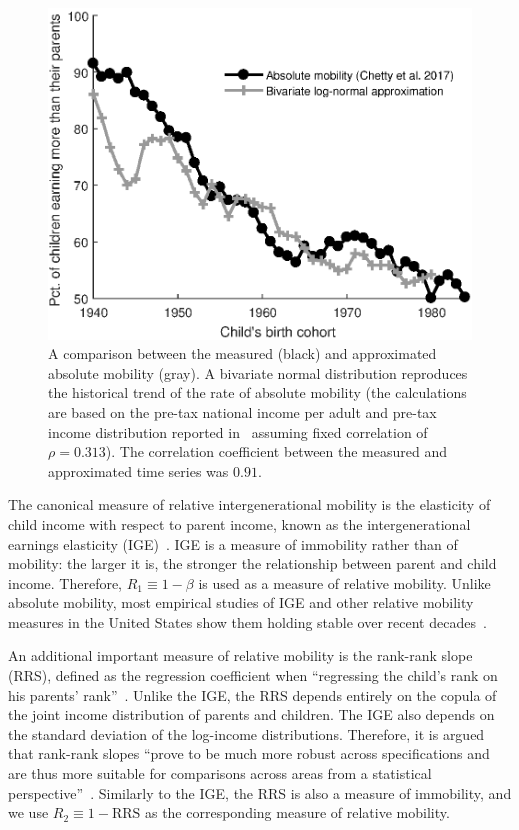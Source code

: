 \documentclass[12pt,a4paper]{article}
\newcommand{\flabel}[1]{\label{fig:#1}}
\numberwithin{equation}{section}
\begin{document}
\begin{figure}[!htb]
\centering
\includegraphics[width=1.0\textwidth] {./figs/trend2.eps}
\caption{A comparison between the measured (black) and approximated absolute mobility (gray). A bivariate normal distribution reproduces the historical trend of the rate of absolute mobility (the calculations are based on the pre-tax national income per adult and pre-tax income distribution reported in~\citet{WID2017} assuming fixed correlation of $\rho=0.313$). The correlation coefficient between the measured and approximated time series was $0.91$.}
\flabel{trend}
\end{figure}

The canonical measure of relative intergenerational mobility is the elasticity of child income with respect to parent income, known as the intergenerational earnings elasticity (IGE)~\citep{mulligan1997parental,lee2009trends,chetty2014land}. IGE is a measure of immobility rather than of mobility: the larger it is, the stronger the relationship between parent and child income. Therefore, $R_1 \equiv 1-\beta$ is used as a measure of relative mobility. Unlike absolute mobility, most empirical studies of IGE and other relative mobility measures in the United States show them holding stable over recent decades~\citep{lee2009trends,hauser2010intergenerational,chetty2014land,chetty2014united}. 

An additional important measure of relative mobility is the rank-rank slope (RRS), defined as the regression coefficient when ``regressing the child's rank on his parents' rank''~\citep[p.~1561]{chetty2014land}. Unlike the IGE, the RRS depends entirely on the copula of the joint income distribution of parents and children. The IGE also depends on the standard deviation of the log-income distributions. Therefore, it is argued that rank-rank slopes ``prove to be much more robust across specifications and are thus more suitable for comparisons across areas from a statistical perspective''~\citep[p.~1561]{chetty2014land}. Similarly to the IGE, the RRS is also a measure of immobility, and we use $R_2 \equiv 1-\text{RRS}$ as the corresponding measure of relative mobility.
\end{document}
